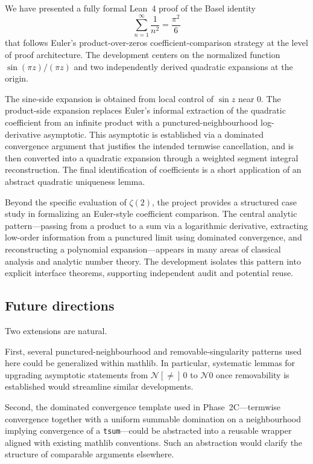 \documentclass[11pt,a4paper]{article}
\theoremstyle{plain}
\theoremstyle{definition}
\newcommand{\nhds}{\ensuremath{\mathcal{N}}}
\newcommand{\nhdsPunct}[1]{\ensuremath{\mathcal{N}[{\neq}]\,#1}}
\begin{document}
We have presented a fully formal Lean~4 proof of the Basel identity
\[
\sum_{n=1}^{\infty}\frac{1}{n^{2}}=\frac{\pi^{2}}{6}
\]
that follows Euler’s product-over-zeros coefficient-comparison strategy at the level of proof architecture. The development centers on the normalized function \(\sin(\pi z)/(\pi z)\) and two independently derived quadratic expansions at the origin.

The sine-side expansion is obtained from local control of \(\sin z\) near \(0\). The product-side expansion replaces Euler’s informal extraction of the quadratic coefficient from an infinite product with a punctured-neighbourhood log-derivative asymptotic. This asymptotic is established via a dominated convergence argument that justifies the intended termwise cancellation, and is then converted into a quadratic expansion through a weighted segment integral reconstruction. The final identification of coefficients is a short application of an abstract quadratic uniqueness lemma.

Beyond the specific evaluation of \(\zeta(2)\), the project provides a structured case study in formalizing an Euler-style coefficient comparison. The central analytic pattern—passing from a product to a sum via a logarithmic derivative, extracting low-order information from a punctured limit using dominated convergence, and reconstructing a polynomial expansion—appears in many areas of classical analysis and analytic number theory. The development isolates this pattern into explicit interface theorems, supporting independent audit and potential reuse.

\subsection{Future directions}

Two extensions are natural.

First, several punctured-neighbourhood and removable-singularity patterns used here could be generalized within mathlib. In particular, systematic lemmas for upgrading asymptotic statements from \(\nhdsPunct{0}\) to \(\nhds 0\) once removability is established would streamline similar developments.

Second, the dominated convergence template used in Phase~2C—termwise convergence together with a uniform summable domination on a neighbourhood implying convergence of a \texttt{tsum}—could be abstracted into a reusable wrapper aligned with existing mathlib conventions. Such an abstraction would clarify the structure of comparable arguments elsewhere.
\end{document}
